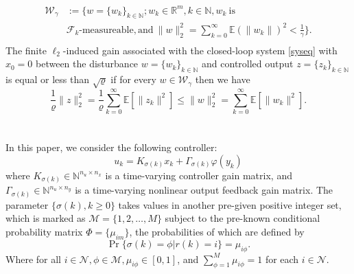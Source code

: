 \documentclass[conference]{IEEEtran}
\begin{document}
\begin{equation}
	\begin{split}
		\mathcal{W}_{\gamma}&:=\{w=\{w_k\}_{k\in\mathbb{N}};w_k\in\mathbb{R}^{m}, k\in\mathbb{N}, w_k \ \text{is} \\
		&\mathcal{F}_k\text{-measureable}, \text{and}\  \|w\|^2_2=\sum_{k=0}^{\infty}\mathbb{E}(\|w_k\|)^2<\frac{1}{\gamma}\}.\\
	\end{split}
\end{equation}
The finite $\ell_2$-induced gain associated with the closed-loop system \eqref{syseq} with $x_0=0$ between the disturbance $w=\{w_k\}_{k\in\mathbb{N}}$ and controlled output $z=\{z_k\}_{k\in\mathbb{N}}$ is equal or less than $\sqrt{\varrho}$ if for every $w\in\mathcal{W}_{\gamma}$ then we have
\begin{equation}
\frac{1}{\varrho}\|z\|^2_2=\frac{1}{\varrho}\sum_{k=0}^{\infty}\mathbb{E}\left[\|z_k\|^2\right] \leq \|w\|^2_2=\sum_{k=0}^{\infty}\mathbb{E}\left[\|w_k\|^2\right].
\end{equation}\\
\\
In this paper, we consider the following controller:
\begin{equation}\label{asycontroller}
u_k=K_{\sigma(k)}x_k+\varGamma_{\sigma(k)}\varphi(y_k) 
\end{equation}
where $K_{\sigma(k)}\in \mathbb{N}^{n_u\times n_x}$ is a time-varying controller gain matrix, and $\varGamma_{\sigma(k)}\in \mathbb{N}^{n_u\times n_y}$ is a time-varying nonlinear output feedback gain matrix. The parameter $\{\sigma(k),k\geq0\}$ takes values in another pre-given positive integer set, which is marked as $\mathcal{M}=\{1,2,\dots,M\}$ subject to the pre-known conditional probability matrix $\varPhi=\{\mu_{im} \}$, the probabilities of which are defined by
\begin{equation}
\Pr\{\sigma(k)=\phi|r(k)=i\}=\mu_{i\phi}.
\end{equation}
Where for all $i\in\mathcal{N}, \phi\in\mathcal{M}, \mu_{i\phi}\in [0,1]$, and $\sum_{\phi=1}^{M}\mu_{i\phi}=1$ for each $i\in\mathcal{N}$.\\
\\
\end{document}
